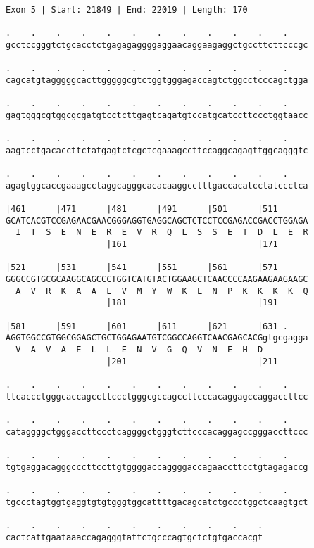 \documentclass{article}
\begin{document}
\newpage
\begin{Verbatim}[fontfamily=courier]
Exon 5 | Start: 21849 | End: 22019 | Length: 170

.    .    .    .    .    .    .    .    .    .    .    .    
gcctccgggtctgcacctctgagagaggggaggaacaggaagaggctgccttcttcccgc

.    .    .    .    .    .    .    .    .    .    .    .    
cagcatgtagggggcacttgggggcgtctggtgggagaccagtctggcctcccagctgga

.    .    .    .    .    .    .    .    .    .    .    .    
gagtgggcgtggcgcgatgtcctcttgagtcagatgtccatgcatccttccctggtaacc

.    .    .    .    .    .    .    .    .    .    .    .    
aagtcctgacaccttctatgagtctcgctcgaaagccttccaggcagagttggcagggtc

.    .    .    .    .    .    .    .    .    .    .    .    
agagtggcaccgaaagcctaggcagggcacacaaggcctttgaccacatcctatccctca

|461      |471      |481      |491      |501      |511      
GCATCACGTCCGAGAACGAACGGGAGGTGAGGCAGCTCTCCTCCGAGACCGACCTGGAGA
  I  T  S  E  N  E  R  E  V  R  Q  L  S  S  E  T  D  L  E  R
                    |161                          |171      

|521      |531      |541      |551      |561      |571      
GGGCCGTGCGCAAGGCAGCCCTGGTCATGTACTGGAAGCTCAACCCCAAGAAGAAGAAGC
  A  V  R  K  A  A  L  V  M  Y  W  K  L  N  P  K  K  K  K  Q
                    |181                          |191      

|581      |591      |601      |611      |621      |631 .    
AGGTGGCCGTGGCGGAGCTGCTGGAGAATGTCGGCCAGGTCAACGAGCACGgtgcgagga
  V  A  V  A  E  L  L  E  N  V  G  Q  V  N  E  H  D         
                    |201                          |211      

.    .    .    .    .    .    .    .    .    .    .    .    
ttcaccctgggcaccagccttccctgggcgccagccttcccacaggagccaggaccttcc

.    .    .    .    .    .    .    .    .    .    .    .    
cataggggctgggaccttccctcaggggctgggtcttcccacaggagccgggaccttccc

.    .    .    .    .    .    .    .    .    .    .    .    
tgtgaggacagggcccttccttgtggggaccaggggaccagaaccttcctgtagagaccg

.    .    .    .    .    .    .    .    .    .    .    .    
tgccctagtggtgaggtgtgtgggtggcattttgacagcatctgccctggctcaagtgct

.    .    .    .    .    .    .    .    .    .    .
cactcattgaataaaccagagggtattctgcccagtgctctgtgaccacgt
\end{Verbatim}
\end{document}
